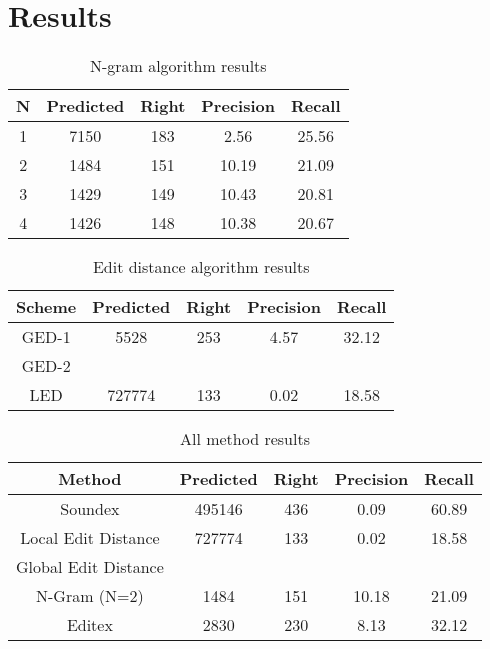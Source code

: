 \documentclass[11pt]{article}
\begin{document}
 
\section{Results}

\begin{table}
	\centering
	\begin{tabular}{c|c|c|c|c}
		\hline
		N &Predicted & Right & Precision & Recall \\
		\hline
		 1 & 7150 & 183 & 2.56 & 25.56 \\
		\hline
		 2 & 1484 & 151 & 10.19 & 21.09  \\
		\hline
		 3 & 1429 & 149 & 10.43 & 20.81 \\
		\hline
		 4 & 1426 & 148 & 10.38 & 20.67 \\
		\hline
	\end{tabular}
	\caption{N-gram algorithm results}
	\label{tab:ngram}
\end{table}

\begin{table}
	\centering
	\begin{tabular}{c|c|c|c|c}
		\hline
		Scheme &Predicted & Right & Precision & Recall \\
		\hline
		 GED-1 & 5528 & 253 & 4.57 & 32.12 \\
		\hline
		GED-2 &  &  &  &   \\
		\hline
		LED & 727774 & 133 & 0.02 & 18.58 \\
		\hline
	\end{tabular}
	\caption{Edit distance algorithm results}
	\label{tab:editdis}
\end{table}


\begin{table*}
	\centering
	\begin{tabular}{c|c|c|c|c}
		\hline
		Method &Predicted & Right & Precision & Recall \\
		\hline
		Soundex & 495146 & 436 & 0.09 & 60.89 \\
		\hline
		Local Edit Distance  & 727774 & 133 & 0.02 & 18.58 \\
		\hline
		Global Edit Distance  &  &  &  &   \\
		\hline
		N-Gram (N=2) & 1484 & 151 & 10.18 & 21.09 \\
		\hline
		Editex & 2830 & 230 & 8.13 & 32.12 \\
		\hline
	\end{tabular}
	\caption{All method results}
	\label{tab:result}
\end{table*}
\end{document}
